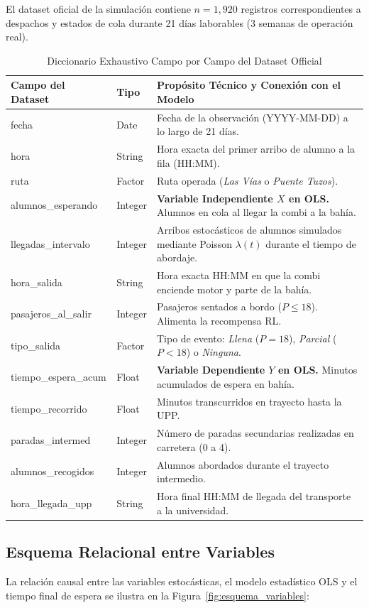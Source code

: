 \documentclass[12pt,letterpaper]{article}
\begin{document}
El dataset oficial de la simulación contiene $n = 1,920$ registros correspondientes a despachos y estados de cola durante 21 días laborables (3 semanas de operación real).

\begin{xltabular}{\textwidth}{>{\ttfamily\raggedright\arraybackslash}p{4.5cm} l X}
	\caption{Diccionario Exhaustivo Campo por Campo del Dataset Official}\\
	\toprule
	\textbf{Campo del Dataset} & \textbf{Tipo} & \textbf{Propósito Técnico y Conexión con el Modelo} \\
	\midrule
	\endhead
	fecha & Date & Fecha de la observación (YYYY-MM-DD) a lo largo de 21 días. \\
	hora & String & Hora exacta del primer arribo de alumno a la fila (HH:MM). \\
	ruta & Factor & Ruta operada (\textit{Las Vías} o \textit{Puente Tuzos}). \\
	alumnos\_esperando & Integer & \textbf{Variable Independiente $X$ en OLS.} Alumnos en cola al llegar la combi a la bahía. \\
	llegadas\_intervalo & Integer & Arribos estocásticos de alumnos simulados mediante Poisson $\lambda(t)$ durante el tiempo de abordaje. \\
	hora\_salida & String & Hora exacta HH:MM en que la combi enciende motor y parte de la bahía. \\
	pasajeros\_al\_salir & Integer & Pasajeros sentados a bordo ($P \le 18$). Alimenta la recompensa RL. \\
	tipo\_salida & Factor & Tipo de evento: \textit{Llena} ($P = 18$), \textit{Parcial} ($P < 18$) o \textit{Ninguna}. \\
	tiempo\_espera\_acum & Float & \textbf{Variable Dependiente $Y$ en OLS.} Minutos acumulados de espera en bahía. \\
	tiempo\_recorrido & Float & Minutos transcurridos en trayecto hasta la UPP. \\
	paradas\_intermed & Integer & Número de paradas secundarias realizadas en carretera (0 a 4). \\
	alumnos\_recogidos & Integer & Alumnos abordados durante el trayecto intermedio. \\
	hora\_llegada\_upp & String & Hora final HH:MM de llegada del transporte a la universidad. \\
	\bottomrule
\end{xltabular}

\subsection{Esquema Relacional entre Variables}
La relación causal entre las variables estocásticas, el modelo estadístico OLS y el tiempo final de espera se ilustra en la Figura~\ref{fig:esquema_variables}:
\end{document}
